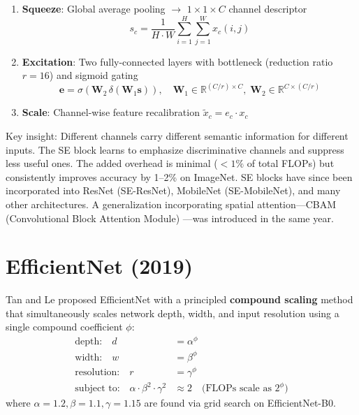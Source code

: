 \begin{architecture}[SE Block]
\begin{enumerate}
    \item \textbf{Squeeze}: Global average pooling $\rightarrow$ $1\times 1\times C$ channel descriptor
    \begin{equation}
    s_c = \frac{1}{H \cdot W}\sum_{i=1}^{H}\sum_{j=1}^{W} x_c(i,j)
    \end{equation}
    \item \textbf{Excitation}: Two fully-connected layers with bottleneck (reduction ratio $r=16$) and sigmoid gating
    \begin{equation}
    \mathbf{e} = \sigma\!\left(\mathbf{W}_2 \,\delta\!\left(\mathbf{W}_1 \mathbf{s}\right)\right), \quad \mathbf{W}_1 \in \mathbb{R}^{(C/r)\times C},\; \mathbf{W}_2 \in \mathbb{R}^{C\times (C/r)}
    \end{equation}
    \item \textbf{Scale}: Channel-wise feature recalibration $\tilde{x}_c = e_c \cdot x_c$
\end{enumerate}
\end{architecture}

Key insight: Different channels carry different semantic information for different inputs. The SE block learns to emphasize discriminative channels and suppress less useful ones. The added overhead is minimal ($<1\%$ of total FLOPs) but consistently improves accuracy by 1--2\% on ImageNet. SE blocks have since been incorporated into ResNet (SE-ResNet), MobileNet (SE-MobileNet), and many other architectures. A generalization incorporating spatial attention---CBAM (Convolutional Block Attention Module) \cite{woo2018cbam}---was introduced in the same year.

\section{EfficientNet (2019)}

Tan and Le \cite{tan2019efficientnet} proposed EfficientNet with a principled \textbf{compound scaling} method that simultaneously scales network depth, width, and input resolution using a single compound coefficient $\phi$:
\begin{align}
\text{depth:} \quad d &= \alpha^\phi \\
\text{width:} \quad w &= \beta^\phi \\
\text{resolution:} \quad r &= \gamma^\phi \\
\text{subject to:} \quad \alpha \cdot \beta^2 \cdot \gamma^2 &\approx 2 \quad \text{(FLOPs scale as $2^\phi$)}
\end{align}
where $\alpha=1.2, \beta=1.1, \gamma=1.15$ are found via grid search on EfficientNet-B0.

